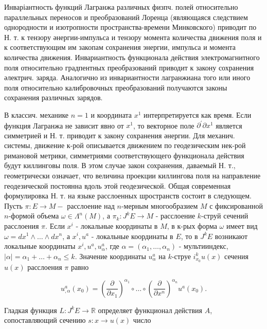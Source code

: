 \documentclass[10pt]{article}
\begin{document}
Инваріантность функций Лагранжа различных физпч. полей относительно параллельных переносов и преобразований Лоренца (являющаяся следствием однородности и изотропности пространства-времени Минковского) приводит по Н. т. к тензору әнергии-импульса и тензору момента количества движения поля и к соответствующим им закопам сохранения энергии, импульса и момента количества движения. Инвариантность функционала действия электромагнитного поля относительно градпентных преобразований приводит к закону сохранения әлектрич. заряда. Аналогично из инвариантности лагранжиана того или иного поля относительно калибровочных преобразований получаются законы сохранения различных зарядов.



В классич. механике $n=1$ и координата $x^{1}$ интерпретируется как время. Если функция Лагранжа не зависит явно от $x^{1}$, то векторное поле $\partial^{\prime} \partial x^{1}$ является симметрией и Н. т. приводит к закону сохранения әнергии. Для механич. системы, движение к-рой описывается движением по геодезическим нек-рой римановой метрики, симметриями соответствующего функционала действия будут киллинговы поля. В этом случае закон сохранения, даваемый Н. т., геометрически означает, что величина проекции киллингова поля на направление геодезической постоянна вдоль этой геодезической. Общая современная формулировка Н. т. на языке расслоенных шространств состоит в следующем. Пусть $\pi: E \rightarrow M-$ расслоение над $n$-мерным многообразием $M$ с фиксированной $n$-формой объема $\omega \in \Lambda^{n}(M)$, а $\pi_{k}: J^{k} E \rightarrow M$ - расслоение $k$-струй сечений расслоения $\pi$. Если $x^{i}$ - локальные координаты в $M$, в к-рых форма $\omega$ имеет вид $\omega=d x^{1} \wedge \ldots \wedge d x^{n}$, а $x^{i}, u^{a}$ - локальные координаты в $E$, то в $J^{k} E$ возникают локальные координаты $x^{i}, u^{a}, u_{\alpha}^{a}$, где $\alpha=\left(\alpha_{1}, \ldots, \alpha_{n}\right)$ - мультииндекс, $|\alpha|=\alpha_{1}+\ldots+\alpha_{n} \leqslant k$. Значение координаты $u_{\alpha}^{a}$ на $k$-струе $i_{x_{0}}^{k} u(x)$ сечения $u(x)$ расслоения $\pi$ равно



\[

u_{, \alpha}^{a}\left(x_{0}\right)=\left(\frac{\partial}{\partial x_{1}}\right)^{\alpha_{1}} \circ \ldots \circ\left(\frac{\partial}{\partial x^{n}}\right)^{\alpha_{n}} u^{a}\left(x_{0}\right) .

\]



Гладкая функция $L: J^{k} E \rightarrow \mathbb{R}$ определяет функционал действия $A$, сопоставляющий сечению $s: x \rightarrow u(x)$ число
\end{document}
